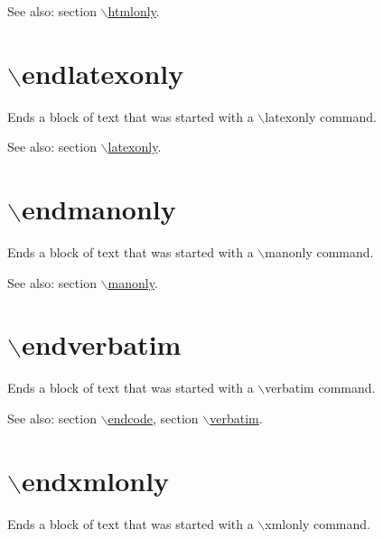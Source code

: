 \begin{Desc}
\item[See also:]section \hyperlink{commands_cmdhtmlonly}{$\backslash$htmlonly}.\end{Desc}


 \hypertarget{commands_cmdendlatexonly}{}\section{$\backslash$endlatexonly}\label{commands_cmdendlatexonly}
 Ends a block of text that was started with a $\backslash$latexonly command.

\begin{Desc}
\item[See also:]section \hyperlink{commands_cmdlatexonly}{$\backslash$latexonly}.\end{Desc}


 \hypertarget{commands_cmdendmanonly}{}\section{$\backslash$endmanonly}\label{commands_cmdendmanonly}
 Ends a block of text that was started with a $\backslash$manonly command.

\begin{Desc}
\item[See also:]section \hyperlink{commands_cmdmanonly}{$\backslash$manonly}.\end{Desc}


 \hypertarget{commands_cmdendverbatim}{}\section{$\backslash$endverbatim}\label{commands_cmdendverbatim}
 Ends a block of text that was started with a $\backslash$verbatim command.

\begin{Desc}
\item[See also:]section \hyperlink{commands_cmdendcode}{$\backslash$endcode}, section \hyperlink{commands_cmdverbatim}{$\backslash$verbatim}.\end{Desc}


 \hypertarget{commands_cmdendxmlonly}{}\section{$\backslash$endxmlonly}\label{commands_cmdendxmlonly}
 Ends a block of text that was started with a $\backslash$xmlonly command.

